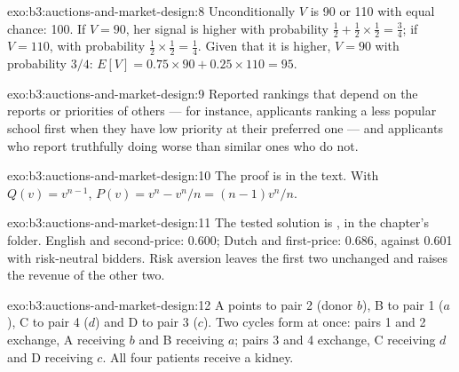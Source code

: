 \begin{solution}{exo:b3:auctions-and-market-design:8}
Unconditionally $V$ is 90 or 110 with equal chance: 100. If $V = 90$, her signal is higher with probability
$\tfrac12 + \tfrac12 \times \tfrac12 = \tfrac34$; if $V = 110$, with probability $\tfrac12 \times \tfrac12 = \tfrac14$. Given that it is higher, $V = 90$ with probability $3/4$:
$E[V] = 0.75 \times 90 + 0.25 \times 110 = 95$.
\end{solution}

\begin{solution}{exo:b3:auctions-and-market-design:9}
Reported rankings that depend on the reports or priorities of others --- for
instance, applicants ranking a less popular school first when they have low
priority at their preferred one --- and applicants who report truthfully doing
worse than similar ones who do not.
\end{solution}

\begin{solution}{exo:b3:auctions-and-market-design:10}
The proof is in the text. With $Q(v) = v^{n-1}$, $P(v) = v^n - v^n/n = (n - 1)v^n/n$.
\end{solution}

\begin{solution}{exo:b3:auctions-and-market-design:11}
The tested solution is , in the chapter's 
folder. English and second-price: 0.600; Dutch and first-price: 0.686, against 0.601 with
risk-neutral bidders. %
Risk aversion leaves the first two unchanged and raises the revenue of the other two.
\end{solution}

\begin{solution}{exo:b3:auctions-and-market-design:12}
A points to pair 2 (donor $b$), B to pair 1 ($a$), C to pair 4 ($d$) and D to pair 3 ($c$). Two cycles form at
once: pairs 1 and 2 exchange, A receiving $b$ and B receiving $a$; pairs 3 and 4 exchange, C receiving $d$
and D receiving $c$. All four patients receive a kidney.
\end{solution}

